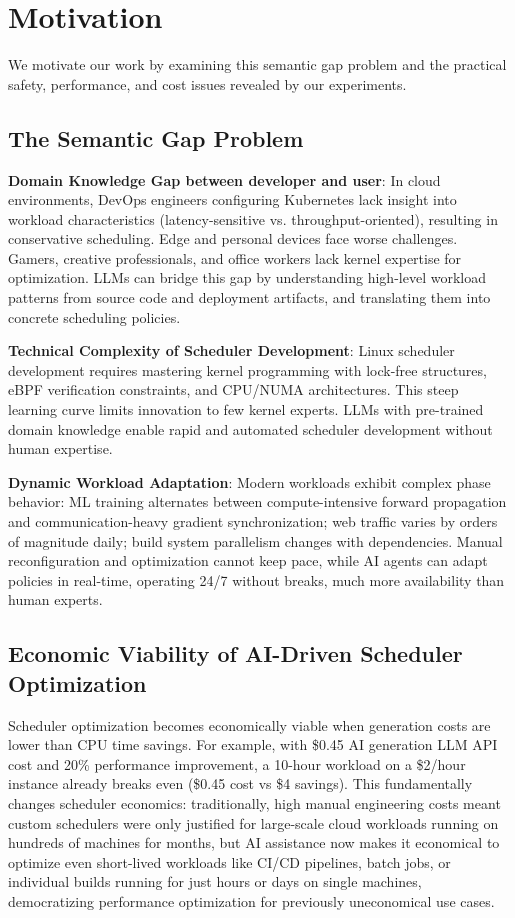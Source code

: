 \section{Motivation}
\label{sec:motivation}

We motivate our work by examining this semantic gap problem and the practical safety, performance, and cost issues revealed by our experiments.

\subsection{The Semantic Gap Problem}

\textbf{Domain Knowledge Gap between developer and user}: In cloud environments, DevOps engineers configuring Kubernetes lack insight into workload characteristics (latency-sensitive vs. throughput-oriented), resulting in conservative scheduling. Edge and personal devices face worse challenges. Gamers, creative professionals, and office workers lack kernel expertise for optimization. LLMs can bridge this gap by understanding high-level workload patterns from source code and deployment artifacts, and translating them into concrete scheduling policies.

\textbf{Technical Complexity of Scheduler Development}: Linux scheduler development requires mastering kernel programming with lock-free structures, eBPF verification constraints, and CPU/NUMA architectures. This steep learning curve limits innovation to few kernel experts. LLMs with pre-trained domain knowledge enable rapid and automated scheduler development without human expertise.

\textbf{Dynamic Workload Adaptation}: Modern workloads exhibit complex phase behavior: ML training alternates between compute-intensive forward propagation and communication-heavy gradient synchronization; web traffic varies by orders of magnitude daily; build system parallelism changes with dependencies. Manual reconfiguration and optimization cannot keep pace, while AI agents can adapt policies in real-time, operating 24/7 without breaks, much more availability than human experts.

\subsection{Economic Viability of AI-Driven Scheduler Optimization}

Scheduler optimization becomes economically viable when generation costs are lower than CPU time savings. For example, with \$0.45 AI generation LLM API cost and 20\% performance improvement, a 10-hour workload on a \$2/hour instance already breaks even (\$0.45 cost vs \$4 savings). This fundamentally changes scheduler economics: traditionally, high manual engineering costs meant custom schedulers were only justified for large-scale cloud workloads running on hundreds of machines for months, but AI assistance now makes it economical to optimize even short-lived workloads like CI/CD pipelines, batch jobs, or individual builds running for just hours or days on single machines, democratizing performance optimization for previously uneconomical use cases.

